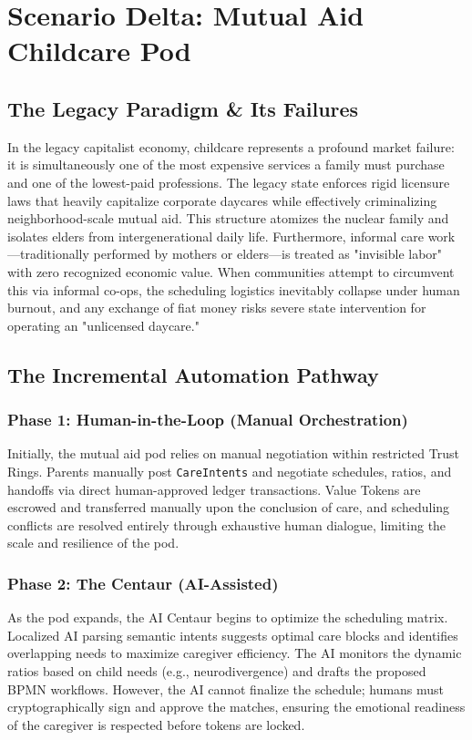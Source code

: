 \chapter{Scenario Delta: Mutual Aid Childcare Pod}

\section{The Legacy Paradigm \& Its Failures}
In the legacy capitalist economy, childcare represents a profound market failure: it is simultaneously one of the most expensive services a family must purchase and one of the lowest-paid professions. The legacy state enforces rigid licensure laws that heavily capitalize corporate daycares while effectively criminalizing neighborhood-scale mutual aid. This structure atomizes the nuclear family and isolates elders from intergenerational daily life. Furthermore, informal care work---traditionally performed by mothers or elders---is treated as "invisible labor" with zero recognized economic value. When communities attempt to circumvent this via informal co-ops, the scheduling logistics inevitably collapse under human burnout, and any exchange of fiat money risks severe state intervention for operating an "unlicensed daycare."

\section{The Incremental Automation Pathway}

\subsection{Phase 1: Human-in-the-Loop (Manual Orchestration)}
Initially, the mutual aid pod relies on manual negotiation within restricted Trust Rings. Parents manually post \texttt{CareIntents} and negotiate schedules, ratios, and handoffs via direct human-approved ledger transactions. Value Tokens are escrowed and transferred manually upon the conclusion of care, and scheduling conflicts are resolved entirely through exhaustive human dialogue, limiting the scale and resilience of the pod.

\subsection{Phase 2: The Centaur (AI-Assisted)}
As the pod expands, the AI Centaur begins to optimize the scheduling matrix. Localized AI parsing semantic intents suggests optimal care blocks and identifies overlapping needs to maximize caregiver efficiency. The AI monitors the dynamic ratios based on child needs (e.g., neurodivergence) and drafts the proposed BPMN workflows. However, the AI cannot finalize the schedule; humans must cryptographically sign and approve the matches, ensuring the emotional readiness of the caregiver is respected before tokens are locked.

